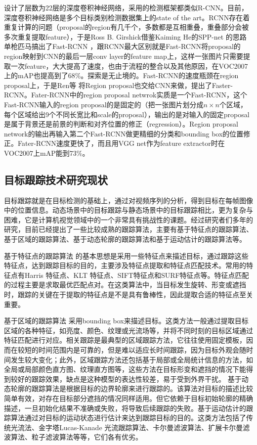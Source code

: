 设计了层数为22层的深度卷积神经网络，采用的检测框架都类似R-CNN。目前，深度卷积神经网络是多个目标类别检测数据集上的state of the art。RCNN存在着重复计算的问题（proposal的region有几千个，多数都是互相重叠，重叠部分会被多次重复提取feature），于是Ross B. Girshick借鉴Kaiming He的SPP-net \cite{sppnet} 的思路单枪匹马搞出了Fast-RCNN \cite{fast-rcnn}，跟RCNN最大区别就是Fast-RCNN将proposal的region映射到CNN的最后一层conv layer的feature map上，这样一张图片只需要提取一次feature，大大提高了速度，也由于流程的整合以及其他原因，在VOC2007上的mAP也提高到了68\%。探索是无止境的。Fast-RCNN的速度瓶颈在region proposal上，于是Ren等 \cite{faster rcnn}将Region proposal也交给CNN来做，提出了Faster-RCNN。Fater-RCNN中的region proposal netwrok实质是一个Fast-RCNN，这个Fast-RCNN输入的region proposal的是固定的（把一张图片划分成$n\times n$个区域，每个区域给出9个不同长宽比和scale的proposal），输出的是对输入的固定proposal是属于背景还是前景的判断和对齐位置的修正（regression）。Region proposal network的输出再输入第二个Fast-RCNN做更精细的分类和bounding box的位置修正。Fater-RCNN速度更快了，而且用VGG net作为feature extractor时在VOC2007上mAP能到73\%。
\subsection{目标跟踪技术研究现状}
目标跟踪就是在目标检测的基础上，通过对视频序列的分析，得到目标在每帧图像中的位置信息。动态场景中的目标跟踪与静态场景中的目标跟踪相比，更为复杂与困难，它是计算机视觉领域中的一个非常具有挑战性的课题。经过研究者们多年的研究，目前已经提出了一些比较成熟的跟踪算法，主要有基于特征点的跟踪算法、基于区域的跟踪算法、基于动态轮廓的跟踪算法和基于运动估计的跟踪算法等。

基于特征点的跟踪算法 \cite{keypoint} 的基本思想是采用一些特征点来描述目标，通过跟踪这些特征点，达到跟踪目标的目的，主要涉及特征点提取和特征点匹配技术。常用的特征点有Harris \cite{harris} 特征点、KLT \cite{klt} 特征点、SIFT特征点和SURF特征点等。特征点匹配的过程主要是求取最优匹配点对。在这类算法中，当目标发生旋转、形变或遮挡时，跟踪的关键在于提取的特征点是不是具有鲁棒性，因此提取合适的特征点至关重要。

基于区域的跟踪算法 \cite{correlation} \cite{error} 采用bounding box来描述目标。这类方法一般通过提取目标区域的各种特征，如亮度、颜色、纹理或光流场等，并将不同时刻的目标区域通过特征匹配进行对应。相关跟踪是最典型的区域跟踪方法，它往往使用固定模板，因而在较短的时间范围内是可靠的，但是难以适应长时间跟踪，因为目标外观会随时间发生较大变化；此外，区域跟踪方法还包括基于局部或全局统计信息的方法，如全局或局部颜色直方图、纹理直方图等，这些方法在目标形变和遮挡的情况下能得到较好的跟踪效果，缺点是这种模型的表达性较差，易于受到外界干扰。
基于动态轮廓的跟踪算法是根据目标的边界轮廓来进行跟踪的。该算法对目标的描述比较简单有效，对存在目标部分遮挡的情况同样适用。但它依赖于目标初始轮廓的精确描述，一旦初始化结果不准确或失败，将导致后续跟踪的失败。基于运动估计的跟踪算法通过对目标的运动状态进行估计来达到跟踪目标的目的。这类方法包括了传统光流法、金字塔Lucas-Kanade 光流跟踪算法、卡尔曼滤波算法、扩展卡尔曼滤波算法、粒子滤波算法等等，它们各有优劣。

